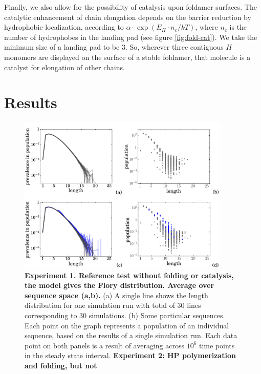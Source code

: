 \documentclass[5p,times]{elsarticle}
\newcommand*{\ga}{\alpha}
\begin{document}
 Finally, we also allow for the possibility of catalysis upon foldamer surfaces.  The catalytic 
enhancement of chain elongation depends on the barrier reduction by hydrophobic localization, 
according to $\ga\cdot\exp(E_{H}\cdot n_{c}/kT)$, where $n_c$ is the number of hydrophobes in the 
landing pad (see figure \ref{fig:fold-cat}).  We take the minimum size of a landing pad to be 3.  
So, wherever three contiguous $H$ monomers are displayed on the surface of a stable foldamer, that 
molecule is a catalyst for elongation of other chains.
 
\section{Results}
\begin{figure}[h!]
  \centering
  \includegraphics[width=0.9\textwidth]{pictures/distr-many-not-good.pdf}
  \caption{\footnotesize{
\textbf{Experiment 1.  Reference test without folding or catalysis, the model gives 
the Flory distribution.  Average over sequence space (a,b).}  (a) A single line shows the length 
distribution for one simulation run with total of 30 lines corresponding to 30 simulations. 
 (b) Some particular sequences. Each point on the graph represents a population of an
individual sequence, based on the results of a single simulation run. Each data point on both 
panels is a result of averaging across $10^6$ time points in the steady state interval.   
    \textbf{Experiment 2: HP polymerization and folding, but not 
}}}
\end{figure}
\end{document}
